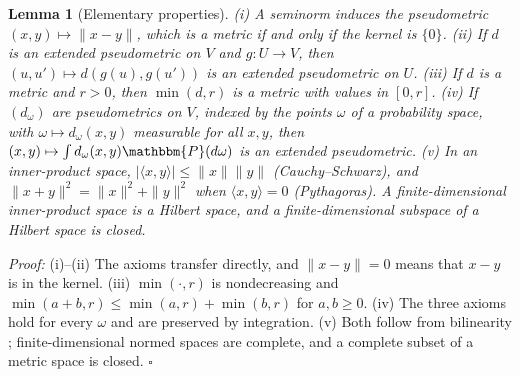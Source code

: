 \documentclass{article}
\newcommand{\PP}{\mathbbm{P}}
\theoremstyle{plain}
\newtheorem{lemma}[theorem]{Lemma}
\theoremstyle{remark}
\begin{document}
\begin{lemma}[Elementary properties]\label{lem:constructions}
(i) A seminorm induces the pseudometric $(x,y)\mapsto\|x-y\|$, which is a metric if and only if the kernel is $\{0\}$.
(ii) If $d$ is an extended pseudometric on $V$ and $g:U\to V$, then $(u,u')\mapsto d(g(u),g(u'))$ is an extended pseudometric on $U$.
(iii) If $d$ is a metric and $r>0$, then $\min(d,r)$ is a metric with values in $[0,r]$.
(iv) If $(d_\omega)$ are pseudometrics on $V$, indexed by the points $\omega$ of a probability space, with $\omega\mapsto d_\omega(x,y)$ measurable for all
$x,y$, then $(x,y)\mapsto\int d_\omega(x,y)\PP(d\omega)$ is an extended pseudometric.
(v) In an inner-product space, $|\langle x,y\rangle|\le\|x\|\|y\|$ (Cauchy--Schwarz), and $\|x+y\|^2=\|x\|^2+\|y\|^2$ when $\langle x,y\rangle=0$
(Pythagoras). A finite-dimensional inner-product space is a Hilbert space, and a finite-dimensional subspace of a Hilbert space is
closed.
\end{lemma}
\textit{Proof:}
(i)--(ii) The axioms transfer directly, and $\|x-y\|=0$ means that $x-y$ is in the kernel. (iii) $\min(\cdot,r)$ is nondecreasing and
$\min(a+b,r)\le\min(a,r)+\min(b,r)$ for $a,b\ge0$. (iv) The three axioms hold for every $\omega$ and are preserved by integration. (v) Both
follow from bilinearity \citep[Sec.~5.1]{brezis2011functional}; finite-dimensional normed spaces are complete, and a complete
subset of a metric space is closed. \hfill$\square$
\end{document}
